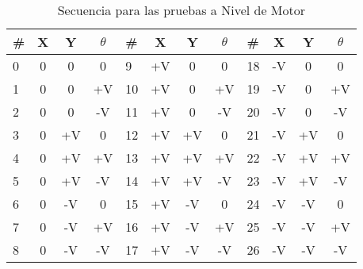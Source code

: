 

\begin{table}
\centering
\caption{Secuencia para las pruebas a Nivel de Motor}
\begin{tabular}{l|c c c | | l | c c c || l | c c c}

\# & X & Y & $\theta$ & \# & X & Y & $\theta$ & \# & X & Y & $\theta$  \\
\hline
0   &  0 &  0 &  0 &  9 & +V &  0 &  0 & 18 & -V &  0 &  0 \\
1   &  0 &  0 & +V & 10 & +V &  0 & +V & 19 & -V &  0 & +V \\
2   &  0 &  0 & -V & 11 & +V &  0 & -V & 20 & -V &  0 & -V \\
3   &  0 & +V &  0 & 12 & +V & +V &  0 & 21 & -V & +V &  0 \\
4   &  0 & +V & +V & 13 & +V & +V & +V & 22 & -V & +V & +V \\
5   &  0 & +V & -V & 14 & +V & +V & -V & 23 & -V & +V & -V \\
6   &  0 & -V &  0 & 15 & +V & -V &  0 & 24 & -V & -V &  0 \\
7   &  0 & -V & +V & 16 & +V & -V & +V & 25 & -V & -V & +V \\
8   &  0 & -V & -V & 17 & +V & -V & -V & 26 & -V & -V & -V \\
\end{tabular}
\label{table:pts_seq_vels}
\end{table}

